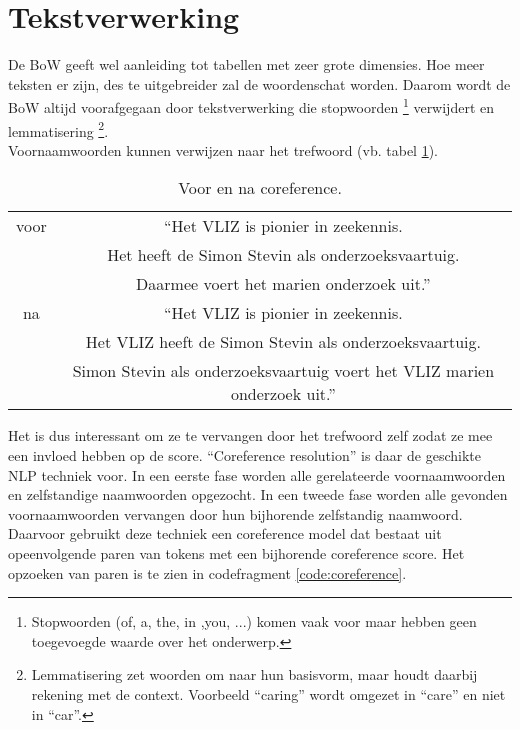 \section{Tekstverwerking}
De BoW geeft wel aanleiding tot tabellen met zeer grote dimensies. Hoe meer teksten er zijn, des te uitgebreider zal de woordenschat worden. Daarom wordt de BoW altijd voorafgegaan door tekstverwerking die stopwoorden \footnote{Stopwoorden (of, a, the, in ,you, ...) komen vaak voor maar hebben geen toegevoegde waarde over het onderwerp.} verwijdert en lemmatisering \footnote{Lemmatisering zet woorden om naar hun basisvorm, maar houdt daarbij rekening met de context. Voorbeeld ``caring'' wordt omgezet in ``care'' en niet in ``car''.}.\\
Voornaamwoorden kunnen verwijzen naar het trefwoord 
(vb. tabel \ref{table:1}).
\begin{table}[h!]
    \centering
    \begin{tabular}{|c|c|} 
        \hline
        voor&``Het VLIZ is pionier in zeekennis.\\&Het heeft de Simon Stevin als onderzoeksvaartuig.\\&Daarmee voert het marien onderzoek uit.''\\
        \hline
        na&``Het VLIZ is pionier in zeekennis.\\&Het VLIZ heeft de Simon Stevin als onderzoeksvaartuig.\\&Simon Stevin als onderzoeksvaartuig voert het VLIZ marien onderzoek uit.''\\
        \hline
    \end{tabular}
    \caption{Voor en na coreference.}
    \label{table:1}
\end{table}
Het is dus interessant om ze te vervangen door het trefwoord zelf zodat ze mee een invloed hebben op de score. ``Coreference resolution'' is daar de geschikte NLP techniek voor. In een eerste fase worden alle gerelateerde voornaamwoorden en zelfstandige naamwoorden opgezocht. In een tweede fase worden alle gevonden voornaamwoorden vervangen door hun bijhorende zelfstandig naamwoord. Daarvoor gebruikt deze techniek een coreference model dat bestaat uit opeenvolgende paren van tokens met een bijhorende coreference score.
Het opzoeken van paren is te zien in codefragment \ref{code:coreference}.

